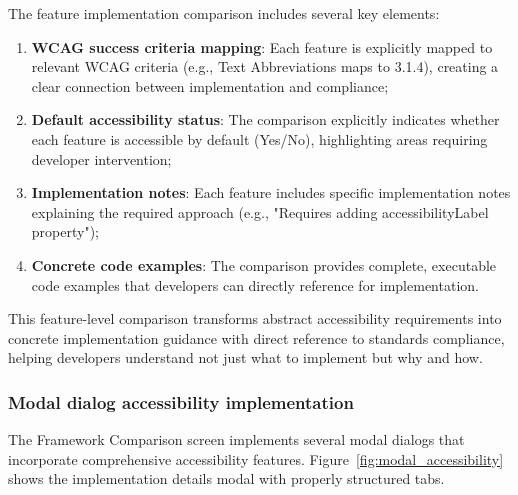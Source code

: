 The feature implementation comparison includes several key elements:

\begin{enumerate}
    \item \textbf{WCAG success criteria mapping}: Each feature is explicitly mapped to relevant WCAG criteria (e.g., Text Abbreviations maps to 3.1.4), creating a clear connection between implementation and compliance;
    
    \item \textbf{Default accessibility status}: The comparison explicitly indicates whether each feature is accessible by default (Yes/No), highlighting areas requiring developer intervention;
    
    \item \textbf{Implementation notes}: Each feature includes specific implementation notes explaining the required approach (e.g., "Requires adding accessibilityLabel property");
    
    \item \textbf{Concrete code examples}: The comparison provides complete, executable code examples that developers can directly reference for implementation.
\end{enumerate}

This feature-level comparison transforms abstract accessibility requirements into concrete implementation guidance with direct reference to standards compliance, helping developers understand not just what to implement but why and how.

\subsubsection{Modal dialog accessibility implementation}

The Framework Comparison screen implements several modal dialogs that incorporate comprehensive accessibility features. Figure~\ref{fig:modal_accessibility} shows the implementation details modal with properly structured tabs.

